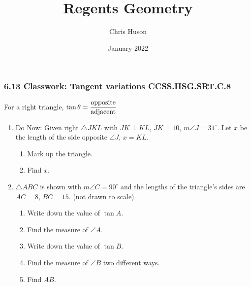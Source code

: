 \documentclass[12pt, twoside]{article}
\title{Regents Geometry}
\author{Chris Huson}
\date{January 2022}
\begin{document}
\subsubsection*{6.13 Classwork: Tangent variations \hfill CCSS.HSG.SRT.C.8}
For a right triangle, $\displaystyle \tan \theta = \frac{\rm{opposite}}{\rm{adjacent}}$
\begin{enumerate}
\item Do Now: Given right $\triangle JKL$ with $\overline{JK} \perp \overline{KL}$, $JK=10$, $m\angle J=31^\circ$. Let $x$ be the length of the side opposite $\angle J$, $x=KL$.
\begin{enumerate}
  \item Mark up the triangle.
  \item Find $x$.
\end{enumerate}
    \begin{flushright}
      \end{flushright}

\item $\triangle ABC$ is shown with $m\angle C=90^\circ$ and the lengths of the triangle's sides are $AC=8$, $BC=15$.  \hfill (not drawn to scale)
  \begin{multicols}{2}
    \begin{enumerate}
      \item Write down the value of $\tan A$. \vspace{1.25cm}
      \item Find the measure of $\angle A$. \vspace{1cm}
      \item Write down the value of $\tan B$. \vspace{1.25cm}
      \item Find the measure of $\angle B$ two different ways. \vspace{1cm}
      \item Find $AB$.
    \end{enumerate}
    \begin{flushright}
    \end{flushright}
  \end{multicols}
  \vspace{3cm}


\end{enumerate}
\end{document}
